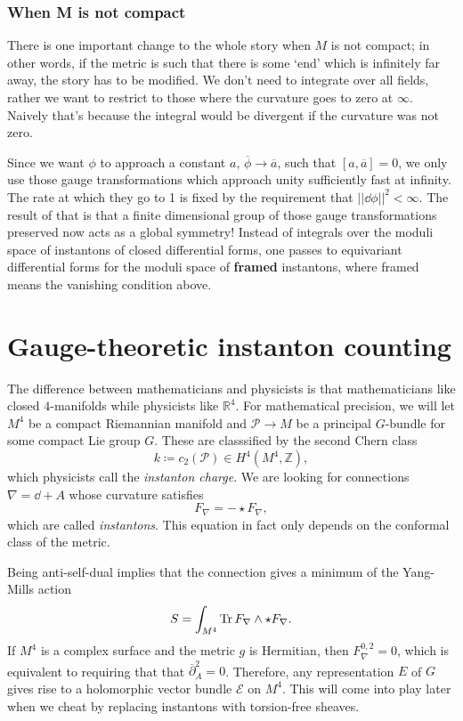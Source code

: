 \documentclass[leqno, openany]{memoir}
\theoremstyle{definition}
\theoremstyle{remark}
\theoremstyle{plain}
\theoremstyle{definition}
\theoremstyle{remark}
\newcommand{\R}{\mathbb{R}}
\newcommand{\Z}{\mathbb{Z}}
\newcommand{\mc}[1]{\mathcal{#1}}
\newcommand{\ol}[1]{\overline{#1}}
\begin{document}
\subsection{When M is not compact}

There is one important change to the whole story when $M$ is not compact; in other words, if the metric is such that there is some `end' which is infinitely far away, the story has to be modified. We don't need to integrate over all fields, rather we want to restrict to those where the curvature goes to zero at $\infty$. Naively that's because the integral would be divergent if the curvature was not zero.

Since we want $\phi$ to approach a constant $a$, $\overline{\phi} \to \overline{a}$, such that $[a, \overline{a}]= 0$, we only use those gauge transformations which approach unity sufficiently fast at infinity. The rate at which they go to 1 is fixed by the requirement that $||\dd\phi||^{2} < \infty$. The result of that is that a finite dimensional group of those gauge transformations preserved now acts as a global symmetry! Instead of integrals over the moduli space of instantons of closed differential forms, one passes to equivariant differential forms for the moduli space of \textbf{framed} instantons, where framed means the vanishing condition above.

\chapter{Gauge-theoretic instanton counting}

The difference between mathematicians and physicists is that mathematicians like closed $4$-manifolds while physicists like $\R^4$. For mathematical precision, we will let $M^4$ be a compact Riemannian manifold and $\mc{P} \to M$ be a principal $G$-bundle for some compact Lie group $G$. These are classsified by the second Chern class
\[ k \coloneqq c_2(\mc{P}) \in H^4(M^4, \Z), \]
which physicists call the \textit{instanton charge}. We are looking for connections $\nabla = \dd + A$ whose curvature satisfies
\[ F_{\nabla} = - \star F_{\nabla}, \]
which are called \textit{instantons}. This equation in fact only depends on the conformal class of the metric.

Being anti-self-dual implies that the connection gives a minimum of the Yang-Mills action
\[ S = \int_{M^4} \Tr F_{\nabla} \wedge \star F_{\nabla}. \]
If $M^4$ is a complex surface and the metric $g$ is Hermitian, then $F_{\nabla}^{0,2} = 0$, which is equivalent to requiring that that $\ol{\partial}_A^2 = 0$. Therefore, any representation $E$ of $G$ gives rise to a holomorphic vector bundle $\mc{E}$ on $M^4$. This will come into play later when we cheat by replacing instantons with torsion-free sheaves.
\end{document}
